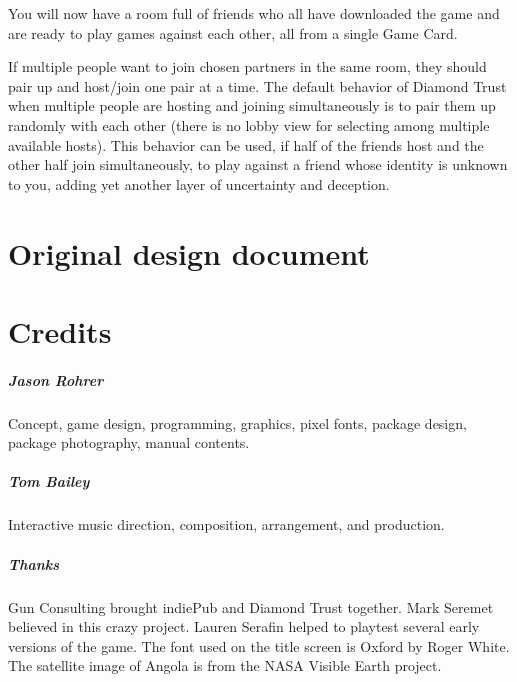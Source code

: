 \documentclass[8pt]{extbook}
\begin{document}
You will now have a room full of friends who all have downloaded the game and are ready to play games against each other, all from a single Game Card.

If multiple people want to join chosen partners in the same room, they should pair up and host/join one pair at a time.  The default behavior of Diamond Trust when multiple people are hosting and joining simultaneously is to pair them up randomly with each other (there is no lobby view for selecting among multiple available hosts).  This behavior can be used, if half of the friends host and the other half join simultaneously, to play against a friend whose identity is unknown to you, adding yet another layer of uncertainty and deception.



\part{Original design document}
\addtocounter{chapter}{1}
\setcounter{section}{0}

\selectfont

\selectfont


\part{Credits}
\addtocounter{chapter}{1}
\setcounter{section}{0}

\subsubsection{Jason Rohrer}
Concept, game design, programming, graphics, pixel fonts, package design, package photography, manual contents.

\subsubsection{Tom Bailey}
Interactive music direction, composition, arrangement, and production.

\subsubsection{Thanks}
Gun Consulting brought indiePub and Diamond Trust together.  Mark Seremet believed in this crazy project.  Lauren Serafin helped to playtest several early versions of the game.  The font used on the title screen is Oxford by Roger White.  The satellite image of Angola is from the NASA Visible Earth project.
\end{document}
